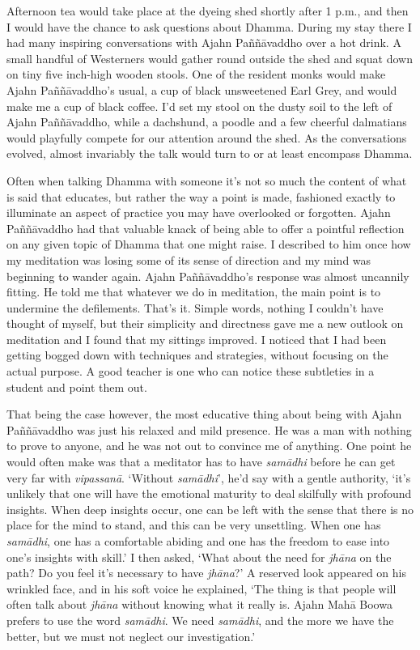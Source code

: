 Afternoon tea would take place at the dyeing shed shortly after 1 p.m.,
and then I would have the chance to ask questions about Dhamma. During
my stay there I had many inspiring conversations with Ajahn Paññāvaddho
over a hot drink. A small handful of Westerners would gather round
outside the shed and squat down on tiny five inch-high wooden stools.
One of the resident monks would make Ajahn Paññāvaddho's usual, a cup of
black unsweetened Earl Grey, and would make me a cup of black coffee.
I'd set my stool on the dusty soil to the left of Ajahn Paññāvaddho,
while a dachshund, a poodle and a few cheerful dalmatians would
playfully compete for our attention around the shed. As the
conversations evolved, almost invariably the talk would turn to or at
least encompass Dhamma.

Often when talking Dhamma with someone it's not so much the content of
what is said that educates, but rather the way a point is made,
fashioned exactly to illuminate an aspect of practice you may have
overlooked or forgotten. Ajahn Paññāvaddho had that valuable knack of
being able to offer a pointful reflection on any given topic of Dhamma
that one might raise. I described to him once how my meditation was
losing some of its sense of direction and my mind was beginning to
wander again. Ajahn Paññāvaddho's response was almost uncannily fitting.
He told me that whatever we do in meditation, the main point is to
undermine the defilements. That's it. Simple words, nothing I couldn't
have thought of myself, but their simplicity and directness gave me a
new outlook on meditation and I found that my sittings improved. I
noticed that I had been getting bogged down with techniques and
strategies, without focusing on the actual purpose. A good teacher is
one who can notice these subtleties in a student and point them out.

That being the case however, the most educative thing about being with
Ajahn Paññāvaddho was just his relaxed and mild presence. He was a man
with nothing to prove to anyone, and he was not out to convince me of
anything. One point he would often make was that a meditator has to have
\emph{samādhi} before he can get very far with \emph{vipassanā}.
`Without \emph{samādhi}', he'd say with a gentle authority, `it's
unlikely that one will have the emotional maturity to deal skilfully
with profound insights. When deep insights occur, one can be left with
the sense that there is no place for the mind to stand, and this can be
very unsettling. When one has \emph{samādhi}, one has a comfortable
abiding and one has the freedom to ease into one's insights with skill.'
I then asked, `What about the need for \emph{jhāna} on the path? Do you
feel it's necessary to have \emph{jhāna}?' A reserved look appeared on
his wrinkled face, and in his soft voice he explained, `The thing is
that people will often talk about \emph{jhāna} without knowing what it
really is. Ajahn Mahā Boowa prefers to use the word \emph{samādhi}. We
need \emph{samādhi}, and the more we have the better, but we must not
neglect our investigation.'

